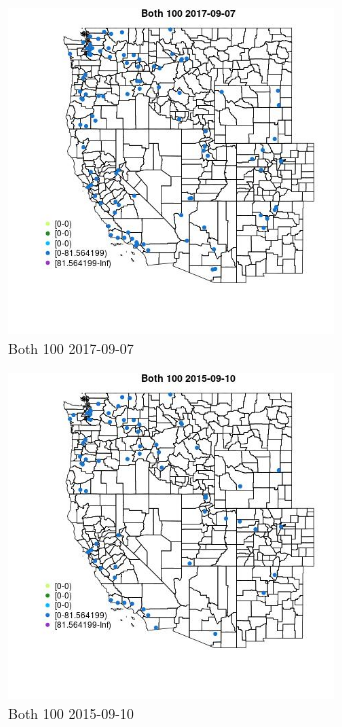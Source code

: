 \begin{figure} 
\centering  
\includegraphics[width=0.77\textwidth]{Code_Outputs/Report_ML_input_PM25_Step4_part_e_de_duplicated_aveswNAs_MapObsBoth_1002017-09-07.jpg} 
\caption{\label{fig:Report_ML_input_PM25_Step4_part_e_de_duplicated_aveswNAsMapObsBoth_1002017-09-07}Both 100 2017-09-07} 
\end{figure} 
 

\clearpage 

\begin{figure} 
\centering  
\includegraphics[width=0.77\textwidth]{Code_Outputs/Report_ML_input_PM25_Step4_part_e_de_duplicated_aveswNAs_MapObsBoth_1002015-09-10.jpg} 
\caption{\label{fig:Report_ML_input_PM25_Step4_part_e_de_duplicated_aveswNAsMapObsBoth_1002015-09-10}Both 100 2015-09-10} 
\end{figure} 
 

